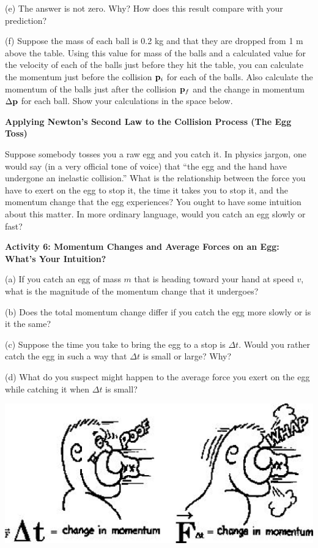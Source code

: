 (e) The answer is not zero. Why? How does this result compare with your 
prediction?
\newpage

(f) Suppose the mass of each ball is 0.2 kg and that they are dropped from 1
m above the table. Using this value for mass of the balls and a calculated value
for the velocity of each of the balls just before they hit the table, you can
calculate the momentum just before the collision \( {{\bf p}_{i}} \)
for each of the balls. Also calculate the momentum of the balls just after the
collision \( {{\bf p}_{f}} \) and the change in momentum \( \Delta {\bf p} \)
for each ball. Show your calculations in the space below.
\answerspace{30mm}

\textbf{Applying Newton's Second Law to the Collision Process (The Egg Toss)}

Suppose somebody tosses you a raw egg and you catch it. In physics jargon, one
would say (in a very official tone of voice) that ``the egg and the
hand have undergone an inelastic collision.'' What is the relationship
between the force you have to exert on the egg to stop it, the time it takes
you to stop it, and the momentum change that the egg experiences? You ought
to have some intuition about this matter. In more ordinary language, would you
catch an egg slowly or fast?

\bigskip
\textbf{Activity 6: Momentum Changes and Average Forces on an Egg: What's Your
Intuition?} 

(a) If you catch an egg of mass $m$ that is heading toward your hand at speed
$v$, what is the magnitude of the momentum change that it undergoes?
\answerspace{10mm}

(b) Does the total momentum change differ if you catch the egg more slowly or
is it the same?
\answerspace{10mm}

(c) Suppose the time you take to bring the egg to a stop is \( \Delta  t\).
Would you rather catch the egg in such a way that \( \Delta  t\) is small or
large? Why?
\answerspace{10mm}

(d) What do you suspect might happen to the average force you exert on the egg
while catching it when \( \Delta t \) is small?
\answerspace{20mm}

\pagebreak[2]
\vspace{0.3cm}
{\par\centering \includegraphics{momentum/momentum_fig2.eps} \par}
\vspace{0.3cm}

